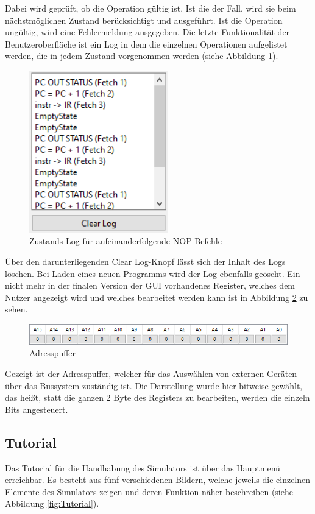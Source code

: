 \documentclass[12pt]{article}
\newcommand{\imgSpaceBefore}{\vspace{10pt}}
\begin{document}
\noindent
Dabei wird geprüft, ob die Operation gültig ist. Ist die der Fall, wird sie beim nächstmöglichen Zustand berücksichtigt und ausgeführt. Ist die Operation ungültig, wird eine Fehlermeldung ausgegeben.
\newpage
\noindent
Die letzte Funktionalität der Benutzeroberfläche ist ein Log in dem die einzelnen Operationen aufgelistet werden, die in jedem Zustand vorgenommen werden (siehe Abbildung \ref{fig:Logger}).\imgSpaceBefore

\begin{figure}[h]
\centering
\includegraphics[width=6cm]{bilder/Logger}
\caption{Zustands-Log für aufeinanderfolgende NOP-Befehle}
\label{fig:Logger}
\end{figure}

\noindent
Über den darunterliegenden \glqq Clear Log\grqq-Knopf lässt sich der Inhalt des Logs löschen. Bei Laden eines neuen Programms wird der Log ebenfalls geöscht. Ein nicht mehr in der finalen Version der GUI vorhandenes Register, welches dem Nutzer angezeigt wird und welches bearbeitet werden kann ist in Abbildung \ref{fig:AddBuff} zu sehen.\imgSpaceBefore

\begin{figure}[h]
\centering
\includegraphics[width=15cm]{bilder/AddBuff}
\caption{Adresspuffer}
\label{fig:AddBuff}
\end{figure}

\noindent
Gezeigt ist der Adresspuffer, welcher für das Auswählen von externen Geräten über das Bussystem zuständig ist. Die Darstellung wurde hier bitweise gewählt, das heißt, statt die ganzen 2 Byte des Registers zu bearbeiten, werden die einzeln Bits angesteuert.


\subsection{Tutorial}
Das Tutorial für die Handhabung des Simulators ist über das Hauptmenü erreichbar. Es besteht aus fünf verschiedenen Bildern, welche jeweils die einzelnen Elemente des Simulators zeigen und deren Funktion näher beschreiben (siehe Abbildung \ref{fig:Tutorial}).\imgSpaceBefore
\end{document}
